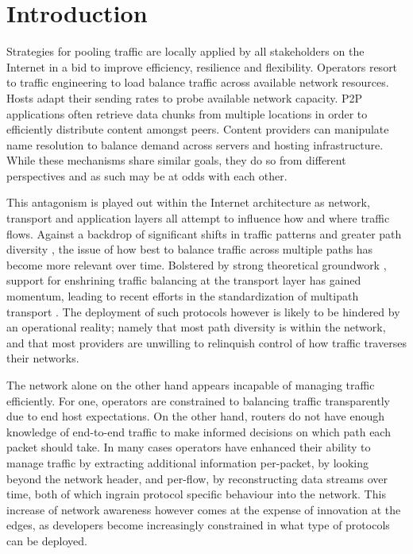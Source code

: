 \chapter{Introduction}
\label{sec:introduction}

Strategies for pooling traffic are locally applied by all stakeholders on the Internet in a bid to improve efficiency, resilience and flexibility.
Operators resort to traffic engineering to load balance traffic across available network resources. 
Hosts adapt their sending rates to probe available network capacity.
\ac{P2P} applications often retrieve data chunks from multiple locations in order to efficiently distribute content amongst peers.
Content providers can manipulate name resolution to balance demand across servers and hosting infrastructure.
While these mechanisms share similar goals, they do so from different perspectives and as such may be at odds with each other.

This antagonism is played out within the Internet architecture as network, transport and application layers all attempt to influence how and where traffic flows.
Against a backdrop of significant shifts in traffic patterns \cite{Cho:2006p104,Cho:2008p488} and greater path diversity \cite{Teixeira:2003p132,Bennett:1999p120,Oliveira:2006p342}, the issue of how best to balance traffic across multiple paths has become more relevant over time.
Bolstered by strong theoretical groundwork \cite{Kelly:2005p140,Key:2007p130}, support for enshrining traffic balancing at the transport layer has gained momentum, leading to recent efforts in the standardization of multipath transport \cite{Ford:2011p490}.
The deployment of such protocols however is likely to be hindered by an operational reality; namely that most path diversity is within the network, and that most providers are unwilling to relinquish control of how traffic traverses their networks.

The network alone on the other hand appears incapable of managing traffic efficiently.
For one, operators are constrained to balancing traffic transparently due to end host expectations.
On the other hand, routers do not have enough knowledge of end-to-end traffic to make informed decisions on which path each packet should take.
In many cases operators have enhanced their ability to manage traffic by extracting additional information per-packet, by looking beyond the network header, and per-flow, by reconstructing data streams over time, both of which ingrain protocol specific behaviour into the network.
This increase of network awareness however comes at the expense of innovation at the edges, as developers become increasingly constrained in what type of protocols can be deployed.

